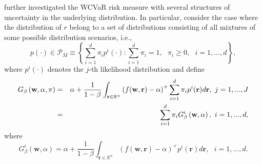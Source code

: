 \documentclass[a4paper,10pt]{article}
\begin{document}
\citet*{zhu2009worst} further investigated the WCVaR risk measure with
several structures of uncertainty in the underlying distribution. In
particular, \citet*{zhu2009worst} consider the case where the distribution
of $r$ belong to a set of distributions consisting of all mixtures of some
possible distribution scenarios, i.e.,
\begin{equation}
p\left( \cdot \right) \in \mathcal{P}_{M}\equiv \left\{ \sum_{i=1}^{d}\pi
_{i}p^{i}\left( \cdot \right) :\sum_{i=1}^{d}\pi _{i}=1,\text{ }\pi _{i}\geq
0,\text{ }i=1,...,d\right\} ,  \label{15}
\end{equation}%
where $p^{i}\left( \cdot \right) $ denotes the $j$-th likelihood
distribution and define
\begin{eqnarray}
G_{\beta }\left( \mathbf{w},\alpha ,\pi \right) &=&\alpha +\frac{1}{1-\beta }%
\int_{\mathbf{r}\in
	\mathbb{R}
	^{n}}\left( f(\mathbf{w},\mathbf{r})-\alpha \right) ^{+}\sum_{i=1}^{d}\pi
_{i}p^{i}(\mathbf{r})d\mathbf{r},\text{ }j=1,...,J  \notag \\
&=&\sum_{i=1}^{d}\pi _{i}G_{\beta }^{i}\left( \mathbf{w},\alpha \right) ,%
\text{ }i=1,...,d,  \label{16}
\end{eqnarray}%
where%
\begin{equation}
G_{\beta }^{i}\left( \mathbf{w},\alpha \right) =\alpha +\frac{1}{1-\beta }%
\int_{\mathbf{r}\in
	\mathbb{R}
	^{n}}\left( f(\mathbf{w},\mathbf{r})-\alpha \right) ^{+}p^{i}(\mathbf{r})d%
\mathbf{r},\text{ }i=1,...,d.  \label{17}
\end{equation}%
\end{document}
